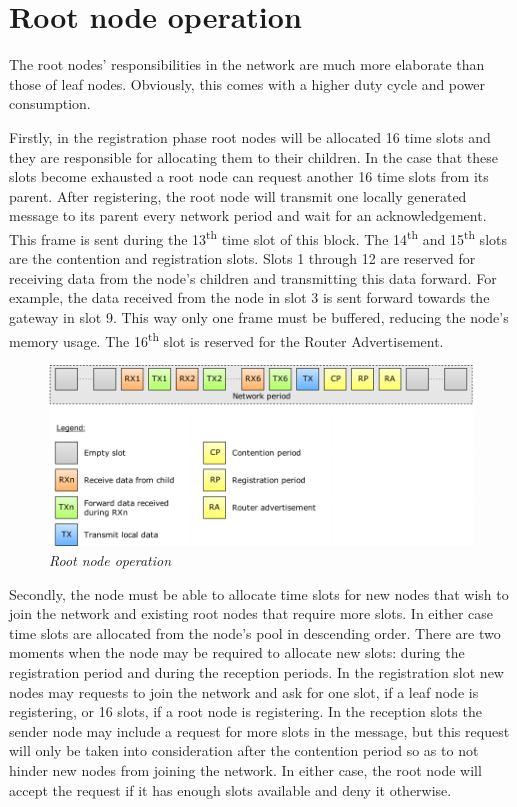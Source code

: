 \section{Root node operation}
\label{sec:root_node_operation}

The root nodes' responsibilities in the network are much more elaborate than
those of leaf nodes. Obviously, this comes with a higher duty cycle and power
consumption. 

Firstly, in the registration phase root nodes will be allocated 16 time slots
and they are responsible for allocating them to their children. In the case
that these slots become exhausted a root node can request another 16 time slots
from its parent. After registering, the root node will transmit one locally
generated message to its parent every network period and wait for an
acknowledgement. This frame is sent during the 13\textsuperscript{th} time slot
of this block. The 14\textsuperscript{th} and 15\textsuperscript{th} slots are
the contention and registration slots. Slots 1 through 12 are reserved for
receiving data from the node's children and transmitting this data forward. For
example, the data received from the node in slot 3 is sent forward towards the
gateway in slot 9. This way only one frame must be buffered, reducing the
node's memory usage. The 16\textsuperscript{th} slot is reserved for the Router
Advertisement.

\begin{figure}[ht]
	\begin{center}
		\includegraphics[width=\textwidth]{img/root_node_operation.pdf}
	\end{center}
	\caption{\small \itshape{Root node operation}}
\end{figure}

Secondly, the node must be able to allocate time slots for new nodes that wish
to join the network and existing root nodes that require more slots. In either
case time slots are allocated from the node's pool in descending order. There
are two moments when the node may be required to allocate new slots: during the
registration period and during the reception periods. In the registration slot
new nodes may requests to join the network and ask for one slot, if a leaf node
is registering, or 16 slots, if a root node is registering. In the reception
slots the sender node may include a request for more slots in the message, but
this request will only be taken into consideration after the contention period
so as to not hinder new nodes from joining the network. In either case, the
root node will accept the request if it has enough slots available and deny it
otherwise.  

